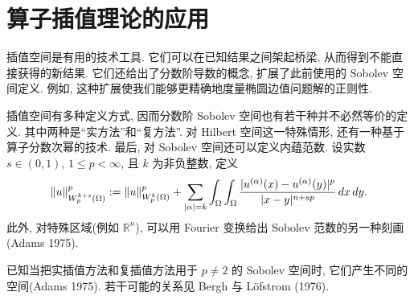 \section{算子插值理论的应用}
\label{chap:ch14-operator-interpolation-applications}

插值空间是有用的技术工具. 它们可以在已知结果之间架起桥梁, 从而得到不能直接获得的新结果. 它们还给出了分数阶导数的概念, 扩展了此前使用的 Sobolev 空间定义. 例如, 这种扩展使我们能够更精确地度量椭圆边值问题解的正则性.

插值空间有多种定义方式, 因而分数阶 Sobolev 空间也有若干种并不必然等价的定义. 其中两种是``实方法''和``复方法''. 对 Hilbert 空间这一特殊情形, 还有一种基于算子分数次幂的技术. 最后, 对 Sobolev 空间还可以定义内蕴范数. 设实数 $s\in(0,1)$, $1\leq p<\infty$, 且 $k$ 为非负整数, 定义
\begin{equation}
\MathBookFormulaID{formula-ch14-intrinsic-fractional-sobolev-norm}
\label{eq:ch14-intrinsic-fractional-sobolev-norm}
\|u\|_{W_p^{k+s}(\Omega)}^p
:=\|u\|_{W_p^k(\Omega)}^p
+\sum_{|\alpha|=k}\int_\Omega\int_\Omega
\frac{|u^{(\alpha)}(x)-u^{(\alpha)}(y)|^p}{|x-y|^{n+sp}}\,dx\,dy.
\end{equation}
此外, 对特殊区域(例如 $\mathbb R^n$), 可以用 Fourier 变换给出 Sobolev 范数的另一种刻画(Adams 1975).

已知当把实插值方法和复插值方法用于 $p\neq2$ 的 Sobolev 空间时, 它们产生不同的空间(Adams 1975). 若干可能的关系见 Bergh 与 Löfstrom (1976).







